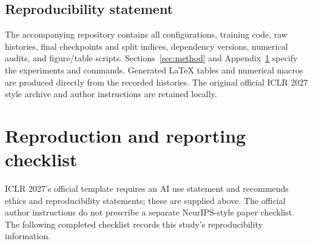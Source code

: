 \documentclass{article}
\begin{document}
\subsection*{Reproducibility statement}
The accompanying repository contains all configurations, training code, raw histories, final checkpoints and split indices, dependency versions, numerical audits, and figure/table scripts. Sections~\ref{sec:method} and Appendix~\ref{sec:reproduction} specify the experiments and commands. Generated \LaTeX{} tables and numerical macros are produced directly from the recorded histories. The original official ICLR 2027 style archive and author instructions are retained locally.



\clearpage
\appendix
\section{Reproduction and reporting checklist}
\label{sec:reproduction}
ICLR 2027's official template requires an AI use statement and recommends ethics and reproducibility statements; these are supplied above. The official author instructions do not prescribe a separate NeurIPS-style paper checklist. The following completed checklist records this study's reproducibility information.
\end{document}

